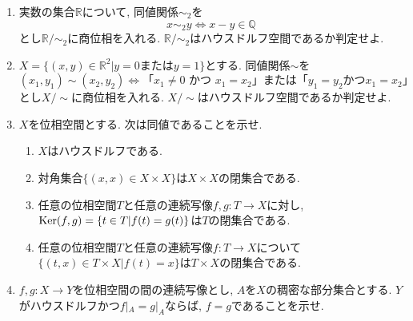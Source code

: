 \documentclass[dvipdfmx,a4paper,11pt]{article}
\newcommand{\R}{\mathbb{R}}
\newcommand{\Q}{\mathbb{Q}}
\theoremstyle{definition}
\begin{document}
\begin{enumerate}[label=\textbf{問}\ref*{sec-Hausdorff}.\arabic*]
\item 実数の集合$\R$について, 同値関係$\sim_{2}$を
	$$
	x \sim_{2} y \Leftrightarrow x - y \in \Q
	$$
	とし$\R / \sim_{2}$に商位相を入れる.  $\R / \sim_{2}$はハウスドルフ空間であるか判定せよ. 
		

\item $X = \{(x,y) \in \R^2| \text{$y=0$または$y=1$} \}$とする. 同値関係$\sim$を
	$$
	(x_1,y_1) \sim (x_2,y_2) \Leftrightarrow \text{「$x_1 \neq 0$ かつ $x_1=x_2$」または「$y_1=y_2$かつ$x_1=x_2$」}
	$$
	とし$X / \sim$に商位相を入れる.  $X/ \sim$はハウスドルフ空間であるか判定せよ. 





\item $X$を位相空間とする. 次は同値であることを示せ.
\begin{enumerate}[label=(\roman*)]
 \setlength{\parskip}{0cm}
  \setlength{\itemsep}{0pt} 
\item $X$はハウスドルフである.
\item 対角集合$\{ (x,x) \in X \times X\}$は$X \times X$の閉集合である.
\item 任意の位相空間$T$と任意の連続写像$f,g : T \rightarrow X$に対し, ${\rm Ker}(f,g) = \{ t \in T | f(t) =g(t)\}$は$T$の閉集合である.
\item 任意の位相空間$T$と任意の連続写像$f : T \rightarrow X$について$\{ (t,x) \in T \times X | f(t) =x\}$は$T \times X$の閉集合である.
\end{enumerate}



\item $f,g : X \rightarrow Y$を位相空間の間の連続写像とし, $A$を$X$の稠密な部分集合とする. 
$Y$がハウスドルフかつ$f|_{A} =g|_{A}$ならば, $f =g$であることを示せ. 







	


\end{enumerate}
\end{document}
